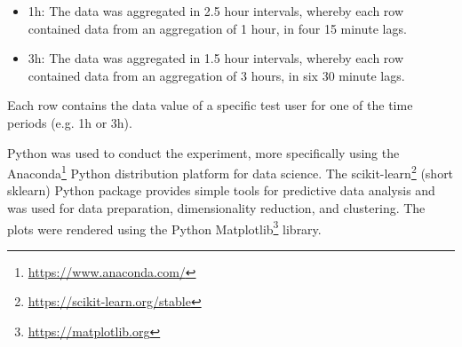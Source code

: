 \begin{itemize}
  \item 1h: The data was aggregated in 2.5 hour intervals, whereby each row contained data from an aggregation of 1 hour, in four 15 minute lags.
  \item 3h: The data was aggregated in 1.5 hour intervals, whereby each row contained data from an aggregation of 3 hours, in six 30 minute lags.
\end{itemize}

Each row contains the data value of a specific test user for one of the time periods (e.g. 1h or 3h).

Python was used to conduct the experiment, more specifically using the Anaconda\footnote{\url{https://www.anaconda.com/}} Python distribution platform for data science. The scikit-learn\footnote{\url{https://scikit-learn.org/stable}} (short sklearn) Python package provides simple tools for predictive data analysis and was used for data preparation, dimensionality reduction, and clustering. The plots were rendered using the Python Matplotlib\footnote{\url{https://matplotlib.org}} library.